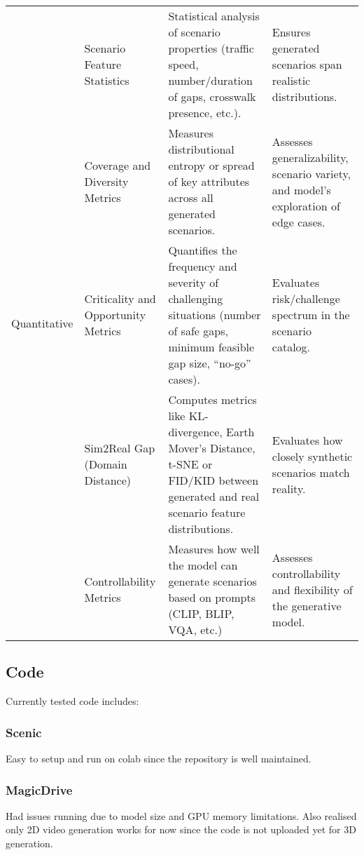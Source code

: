 \documentclass{article}
\begin{document}
\begin{table}[ht]
{\begin{tabular}{|p{2.5cm}|p{3.5cm}|p{6.2cm}|p{4.5cm}|}
\multirow{5}{*}{Quantitative}
& Scenario Feature Statistics & Statistical analysis of scenario properties (traffic speed, number/duration of gaps, crosswalk presence, etc.). & Ensures generated scenarios span realistic distributions. \\
\cline{2-4}
& Coverage and Diversity Metrics & Measures distributional entropy or spread of key attributes across all generated scenarios. & Assesses generalizability, scenario variety, and model's exploration of edge cases. \\
\cline{2-4}
& Criticality and Opportunity Metrics & Quantifies the frequency and severity of challenging situations (number of safe gaps, minimum feasible gap size, “no-go” cases). & Evaluates risk/challenge spectrum in the scenario catalog. \\
\cline{2-4}
& Sim2Real Gap (Domain Distance) & Computes metrics like KL-divergence, Earth Mover's Distance, t-SNE or FID/KID between generated and real scenario feature distributions. & Evaluates how closely synthetic scenarios match reality. \\
\cline{2-4}
& Controllability Metrics & Measures how well the model can generate scenarios based on prompts (CLIP, BLIP, VQA, etc.) & Assesses controllability and flexibility of the generative model. \\
\hline

\end{tabular}
}
\label{tab:validation}
\end{table}



\subsection{Code}

Currently tested code includes:

\subsubsection{Scenic}

Easy to setup and run on colab since the repository is well maintained.

\subsubsection{MagicDrive}

Had issues running due to model size and GPU memory limitations. Also realised only 2D video generation works for now since the code is not uploaded yet for 3D generation.
\end{document}
